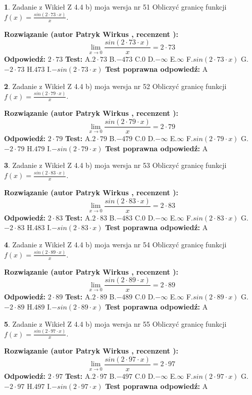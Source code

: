 \documentclass[12pt, a4paper]{article}
\theoremstyle{definition} %
\newtheorem{zad}{}
\newcommand{\zadStart}[1]{\begin{zad}#1\newline}
\newcommand{\zadStop}{\end{zad}}
\newcommand{\rozwStart}[2]{\noindent \textbf{Rozwiązanie (autor #1 , recenzent #2): }\newline}
\newcommand{\rozwStop}{\newline}
\newcommand{\odpStart}{\noindent \textbf{Odpowiedź:}\newline}
\newcommand{\odpStop}{\newline}
\newcommand{\testStart}{\noindent \textbf{Test:}\newline}
\newcommand{\testStop}{\newline}
\newcommand{\kluczStart}{\noindent \textbf{Test poprawna odpowiedź:}\newline}
\newcommand{\kluczStop}{\newline}
\begin{document}
\zadStart{Zadanie z Wikieł Z 4.4 b) moja wersja nr 51}
Obliczyć granicę funkcji $f(x)=\frac{sin(2 \cdot73\cdot x)}{x}$.
\zadStop
\rozwStart{Patryk Wirkus}{}
$$\lim\limits_{x\to 0}\frac{sin(2 \cdot 73\cdot x)}{x}=
2 \cdot 73$$
\rozwStop
\odpStart
$2 \cdot 73$
\odpStop
\testStart
A.$2 \cdot 73$
B.$-473$
C.$0$
D.$-\infty$
E.$\infty$
F.$sin(2 \cdot 73\cdot x)$
G.$-2 \cdot 73$
H.$473$
I.$-sin(2 \cdot 73\cdot x)$
\testStop
\kluczStart
A
\kluczStop



\zadStart{Zadanie z Wikieł Z 4.4 b) moja wersja nr 52}
Obliczyć granicę funkcji $f(x)=\frac{sin(2 \cdot79\cdot x)}{x}$.
\zadStop
\rozwStart{Patryk Wirkus}{}
$$\lim\limits_{x\to 0}\frac{sin(2 \cdot 79\cdot x)}{x}=
2 \cdot 79$$
\rozwStop
\odpStart
$2 \cdot 79$
\odpStop
\testStart
A.$2 \cdot 79$
B.$-479$
C.$0$
D.$-\infty$
E.$\infty$
F.$sin(2 \cdot 79\cdot x)$
G.$-2 \cdot 79$
H.$479$
I.$-sin(2 \cdot 79\cdot x)$
\testStop
\kluczStart
A
\kluczStop



\zadStart{Zadanie z Wikieł Z 4.4 b) moja wersja nr 53}
Obliczyć granicę funkcji $f(x)=\frac{sin(2 \cdot83\cdot x)}{x}$.
\zadStop
\rozwStart{Patryk Wirkus}{}
$$\lim\limits_{x\to 0}\frac{sin(2 \cdot 83\cdot x)}{x}=
2 \cdot 83$$
\rozwStop
\odpStart
$2 \cdot 83$
\odpStop
\testStart
A.$2 \cdot 83$
B.$-483$
C.$0$
D.$-\infty$
E.$\infty$
F.$sin(2 \cdot 83\cdot x)$
G.$-2 \cdot 83$
H.$483$
I.$-sin(2 \cdot 83\cdot x)$
\testStop
\kluczStart
A
\kluczStop



\zadStart{Zadanie z Wikieł Z 4.4 b) moja wersja nr 54}
Obliczyć granicę funkcji $f(x)=\frac{sin(2 \cdot89\cdot x)}{x}$.
\zadStop
\rozwStart{Patryk Wirkus}{}
$$\lim\limits_{x\to 0}\frac{sin(2 \cdot 89\cdot x)}{x}=
2 \cdot 89$$
\rozwStop
\odpStart
$2 \cdot 89$
\odpStop
\testStart
A.$2 \cdot 89$
B.$-489$
C.$0$
D.$-\infty$
E.$\infty$
F.$sin(2 \cdot 89\cdot x)$
G.$-2 \cdot 89$
H.$489$
I.$-sin(2 \cdot 89\cdot x)$
\testStop
\kluczStart
A
\kluczStop



\zadStart{Zadanie z Wikieł Z 4.4 b) moja wersja nr 55}
Obliczyć granicę funkcji $f(x)=\frac{sin(2 \cdot97\cdot x)}{x}$.
\zadStop
\rozwStart{Patryk Wirkus}{}
$$\lim\limits_{x\to 0}\frac{sin(2 \cdot 97\cdot x)}{x}=
2 \cdot 97$$
\rozwStop
\odpStart
$2 \cdot 97$
\odpStop
\testStart
A.$2 \cdot 97$
B.$-497$
C.$0$
D.$-\infty$
E.$\infty$
F.$sin(2 \cdot 97\cdot x)$
G.$-2 \cdot 97$
H.$497$
I.$-sin(2 \cdot 97\cdot x)$
\testStop
\kluczStart
A
\kluczStop
\end{document}
